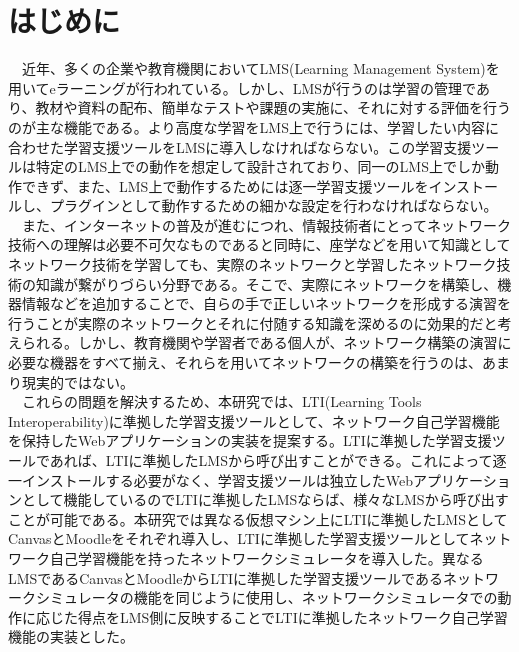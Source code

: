 \section{はじめに}
\label{tag:first}
　近年、多くの企業や教育機関においてLMS(Learning Management System)を用いてeラーニングが行われている。しかし、LMSが行うのは学習の管理であり、教材や資料の配布、簡単なテストや課題の実施に、それに対する評価を行うのが主な機能である。より高度な学習をLMS上で行うには、学習したい内容に合わせた学習支援ツールをLMSに導入しなければならない。この学習支援ツールは特定のLMS上での動作を想定して設計されており、同一のLMS上でしか動作できず、また、LMS上で動作するためには逐一学習支援ツールをインストールし、プラグインとして動作するための細かな設定を行わなければならない。\\
　また、インターネットの普及が進むにつれ、情報技術者にとってネットワーク技術への理解は必要不可欠なものであると同時に、座学などを用いて知識としてネットワーク技術を学習しても、実際のネットワークと学習したネットワーク技術の知識が繋がりづらい分野である。そこで、実際にネットワークを構築し、機器情報などを追加することで、自らの手で正しいネットワークを形成する演習を行うことが実際のネットワークとそれに付随する知識を深めるのに効果的だと考えられる。しかし、教育機関や学習者である個人が、ネットワーク構築の演習に必要な機器をすべて揃え、それらを用いてネットワークの構築を行うのは、あまり現実的ではない。\\
　これらの問題を解決するため、本研究では、LTI(Learning Tools Interoperability)に準拠した学習支援ツールとして、ネットワーク自己学習機能を保持したWebアプリケーションの実装を提案する。LTIに準拠した学習支援ツールであれば、LTIに準拠したLMSから呼び出すことができる。これによって逐一インストールする必要がなく、学習支援ツールは独立したWebアプリケーションとして機能しているのでLTIに準拠したLMSならば、様々なLMSから呼び出すことが可能である。本研究では異なる仮想マシン上にLTIに準拠したLMSとしてCanvasとMoodleをそれぞれ導入し、LTIに準拠した学習支援ツールとしてネットワーク自己学習機能を持ったネットワークシミュレータを導入した。異なるLMSであるCanvasとMoodleからLTIに準拠した学習支援ツールであるネットワークシミュレータの機能を同じように使用し、ネットワークシミュレータでの動作に応じた得点をLMS側に反映することでLTIに準拠したネットワーク自己学習機能の実装とした。
